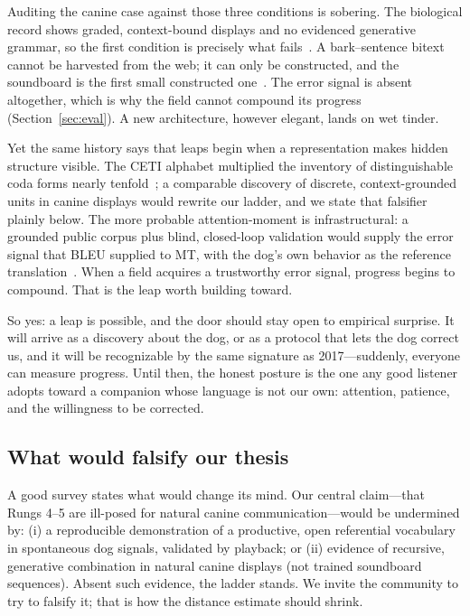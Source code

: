 Auditing the canine case against those three conditions is sobering.
The biological record shows graded, context-bound displays and no
evidenced generative grammar, so the first condition is precisely what
fails~\cite{pongracz2005barks,farago2017growls}. A bark--sentence bitext
cannot be harvested from the web; it can only be constructed, and the
soundboard is the first small constructed one~\cite{bastos2024plos}.
The error signal is absent altogether, which is why the field cannot
compound its progress (Section~\ref{sec:eval}). A new architecture,
however elegant, lands on wet tinder.

Yet the same history says that leaps begin when a representation makes
hidden structure visible. The CETI alphabet multiplied the inventory of
distinguishable coda forms nearly tenfold~\cite{sharma2024whale}; a
comparable discovery of discrete, context-grounded units in canine
displays would rewrite our ladder, and we state that falsifier plainly
below. The more probable attention-moment is infrastructural: a grounded
public corpus plus blind, closed-loop validation would supply the error
signal that BLEU supplied to MT, with the dog's own behavior as the
reference translation~\cite{bastos2024scirep,google2025dolphingemma}.
When a field acquires a trustworthy error signal, progress begins to
compound. That is the leap worth building toward.

So yes: a leap is possible, and the door should stay open to empirical
surprise. It will arrive as a discovery about the dog, or as a protocol
that lets the dog correct us, and it will be recognizable by the same
signature as 2017---suddenly, everyone can measure progress. Until then,
the honest posture is the one any good listener adopts toward a companion
whose language is not our own: attention, patience, and the willingness
to be corrected.

\subsection{What would falsify our thesis}
A good survey states what would change its mind. Our central claim---that
Rungs 4--5 are ill-posed for natural canine communication---would be
undermined by: (i) a reproducible demonstration of a productive, open
referential vocabulary in spontaneous dog signals, validated by playback;
or (ii) evidence of recursive, generative combination in natural canine
displays (not trained soundboard sequences). Absent such evidence, the
ladder stands. We invite the community to try to falsify it; that is how
the distance estimate should shrink.